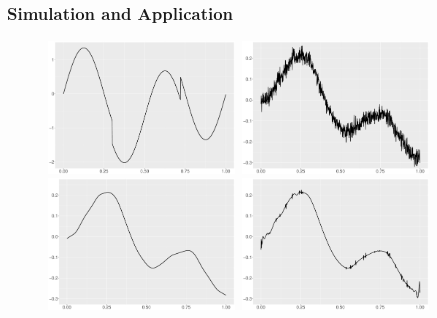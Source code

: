\documentclass{beamer}
\begin{document}
\begin{frame}
\frametitle{Simulation and Application}
\begin{figure}
\centering
\includegraphics[width=5cm,height=3.5cm]{Chapters/02TractorSplineTheory/plot/ggplot/ggHeaviSine.pdf}
\includegraphics[width=5cm,height=3.5cm]{Chapters/02TractorSplineTheory/plot/ggplot/ggHeaviSinePositionNoise}\\
\includegraphics[width=5cm,height=3.5cm]{Chapters/02TractorSplineTheory/plot/ggplot/ggHeaviSinePSpline}
\includegraphics[width=5cm,height=3.5cm]{Chapters/02TractorSplineTheory/plot/ggplot/ggHeaviSineSure}
\end{figure}
\end{frame}
\end{document}
